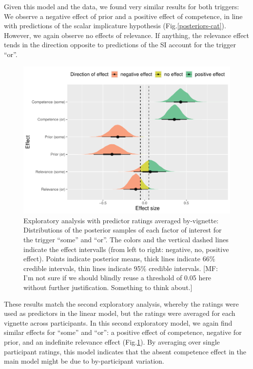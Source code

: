 \documentclass{sp}
\newcommand{\mf}[1]{\textcolor{BurntOrange}{[MF: #1]}}
\begin{document}
Given this model and the data, we found very similar results for both triggers: We observe a negative effect of prior and a positive effect of competence, in line with predictions of the scalar implicature hypothesis (Fig.\ref{posteriors-cat}). However, we again observe no effects of relevance. If anything, the relevance effect tends in the direction opposite to predictions of the SI account for the trigger ``or''. 

\begin{figure}[h]
	\begin{center}
		\includegraphics[width=1\linewidth]{images/posterior-effects-means.pdf}
	\end{center}
	\vspace{-0.3cm}
	\caption{Exploratory analysis with predictor ratings averaged by-vignette: Distributions of the posterior samples of each factor of interest for the trigger ``some'' and ``or''. The colors and the vertical dashed lines indicate the effect intervalls (from left to right: negative, no, positive effect). Points indicate posterior means, thick lines indicate 66\% credible intervals, thin lines indicate 95\% credible intervals. \mf{I'm not sure if we should blindly reuse a threshold of 0.05 here without further justification. Something to think about.}}
	\label{posteriors-mean}
\end{figure}

These results match the second exploratory analysis, whereby the ratings were used as predictors in the linear model, but the ratings were averaged for each vignette across participants. In this second  exploratory model, we again find similar effects for ``some'' and ``or'': a positive effect of competence, negative for prior, and an indefinite relevance effect (Fig.\ref{posteriors-mean}). By averaging over single participant ratings, this model indicates that the absent competence effect in the main model might be due to by-participant variation.
\end{document}
